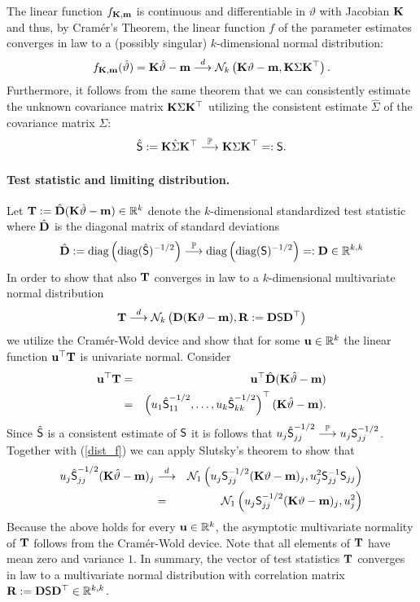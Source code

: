 \documentclass[12pt]{article}
\begin{document}
The linear function $f_{\K, \m}$ is continuous and differentiable in
$\vartheta$ with Jacobian $\K$ and thus, by Cram{\'e}r's Theorem, 
the linear function $f$ of the parameter estimates
converges in law to a (possibly singular) $k$-dimensional normal distribution:
\begin{eqnarray} \label{dist_f}
f_{\K, \m}(\hat{\vartheta}) = \K \hat{\vartheta} - \m 
\cL \N_k\left(\K \vartheta - \m, \K \Sigma \K^\top\right).
\end{eqnarray}
Furthermore, it follows from the same theorem that we can 
consistently estimate the unknown covariance matrix $\K \Sigma \K^\top$ utilizing
the consistent estimate $\hat{\Sigma}$ of the covariance matrix $\Sigma$:
\begin{eqnarray*}
\hat{\S} := \K \hat{\Sigma} \K^\top \cP \K \Sigma \K^\top =: \S.
\end{eqnarray*}

\paragraph{Test statistic and limiting distribution.}

Let $\T := \hat{\D} (\K \hat{\vartheta} - \m) \in \R^k$ denote
the $k$-dimensional standardized test statistic where $\hat{\D}$ is the diagonal
matrix of standard deviations
\begin{eqnarray*}
\hat{\D} := \text{diag}\left(\text{diag}(\hat{\S})^{-1/2}\right) \cP 
\text{diag}\left(\text{diag}(\S)^{-1/2}\right) =: \D \in \R^{k,k}
\end{eqnarray*}
In order to show that also $\T$ converges in law to a $k$-dimensional multivariate
normal distribution
\begin{eqnarray*}
\T \cL \N_k\left(\D(\K \vartheta - \m), \Cor := \D \S \D^\top\right)
\end{eqnarray*}
we utilize the Cram{\'e}r-Wold device and show that for some $\uu \in \R^k$ 
the linear function $\uu^\top \T$ is univariate normal. Consider
\begin{eqnarray*}
\uu^\top \T & = & \uu^\top \hat{\D} (\K \hat{\vartheta} - \m) \\
& = & \left(u_1 \hat{\S}_{11}^{-1/2}, \dots, u_k \hat{\S}_{kk}^{-1/2}\right)^\top(\K \hat{\vartheta} - \m).
\end{eqnarray*}
Since $\hat{\S}$ is a consistent estimate of $\S$ it 
is follows that $u_j \hat{\S}_{jj}^{-1/2} \cP u_j \S_{jj}^{-1/2}$.
Together with (\ref{dist_f}) we can apply Slutsky's theorem to show that
\begin{eqnarray*}
u_j \hat{\S}_{jj}^{-1/2} (\K \hat{\vartheta} - \m)_j & \cL &  
\N_1\left(u_j \S_{jj}^{-1/2} (\K \vartheta - \m)_j, u_j^2 \S_{jj}^{-1} \S_{jj}\right) \\
& = & \N_1\left(u_j \S_{jj}^{-1/2} (\K \vartheta - \m)_j, u_j^2\right)
\end{eqnarray*}
Because the above holds for every $\uu \in \R^k$, the asymptotic multivariate
normality of $\T$ follows from the Cram{\'e}r-Wold device. Note that
all elements of $\T$ have mean zero and variance $1$. In summary,
the vector of test statistics $\T$ converges in law to a multivariate
normal distribution with correlation matrix 
$\Cor := \D \S \D^\top \in \R^{k,k}$.
\end{document}
